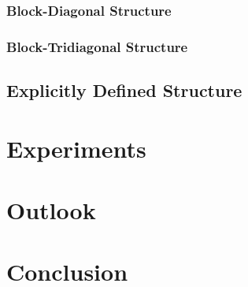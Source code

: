 \documentclass[a4paper, 11pt, oneside]{scrartcl}
\theoremstyle{break}
\numberwithin{equation}{section}
\begin{document}
			\subsubsection{Block-Diagonal Structure}
			\subsubsection{Block-Tridiagonal Structure}
		\subsection{Explicitly Defined Structure}

	\section{Experiments}

	\section{Outlook}

	\section{Conclusion}

	\newpage
	\printbibliography
\end{document}
